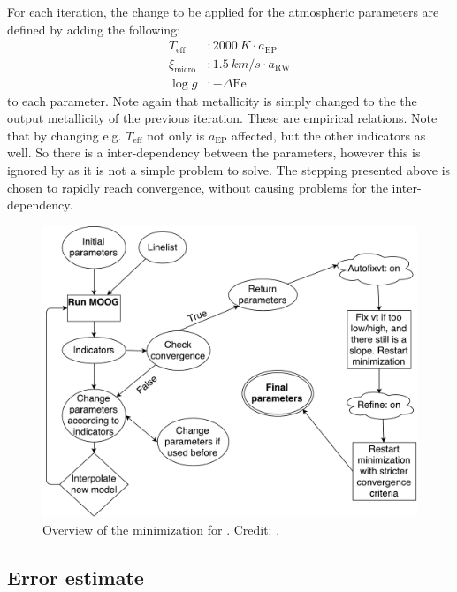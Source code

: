 For each iteration, the change to be applied for the atmospheric parameters are
defined by adding the following:
\begin{align}
  T_\mathrm{eff}     &: \SI{2000}{K} \cdot a_\mathrm{EP}   \\
  \xi_\mathrm{micro} &: \SI{1.5}{km/s} \cdot a_\mathrm{RW} \\
  \log g             &: -\Delta\mathrm{Fe}
\end{align}
to each parameter. Note again that metallicity is simply changed to the the
output metallicity of the previous iteration. These are empirical relations.
Note that by changing e.g. $T_\mathrm{eff}$ not only is $a_\mathrm{EP}$
affected, but the other indicators as well. So there is a inter-dependency
between the parameters, however this is ignored by \FASMA as it is not a simple
problem to solve. The stepping presented above is chosen to rapidly reach
convergence, without causing problems for the inter-dependency.

\begin{figure}[htpb!]
    \centering
    \includegraphics[width=0.85\linewidth]{figures/FASMA_minimization.pdf}
    \caption{Overview of the minimization for \FASMA. Credit: \citet{Andreasen2017a}.}
    \label{fig:minimization}
\end{figure}

\subsection{Error estimate}
